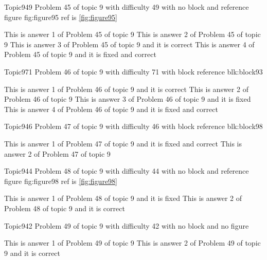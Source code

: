 \documentclass[master]{exam}
\begin{document}
\begin{problem}{Topic9}{49}
	Problem 45 of topic 9 with difficulty 49 with no block and reference figure fig:figure95 ref is \ref{fig:figure95}
	\begin{answers}
		\answer This is answer 1 of Problem 45 of topic 9 
		\answer This is answer 2 of Problem 45 of topic 9 
		\answer[correct] This is answer 3 of Problem 45 of topic 9 and it is correct
		 This is answer 4 of Problem 45 of topic 9 and it is fixed and correct
	\end{answers}
\end{problem}

\begin{problem}[requires=blk:block93]{Topic9}{71}
	Problem 46 of topic 9 with difficulty 71 with block reference blk:block93
	\begin{answers}
		\answer[correct] This is answer 1 of Problem 46 of topic 9 and it is correct
		\answer This is answer 2 of Problem 46 of topic 9 
		\answer[fixed] This is answer 3 of Problem 46 of topic 9 and it is fixed
		 This is answer 4 of Problem 46 of topic 9 and it is fixed and correct
	\end{answers}
\end{problem}

\begin{problem}[requires=blk:block98]{Topic9}{46}
	Problem 47 of topic 9 with difficulty 46 with block reference blk:block98
	\begin{answers}
		 This is answer 1 of Problem 47 of topic 9 and it is fixed and correct
		\answer This is answer 2 of Problem 47 of topic 9 
	\end{answers}
\end{problem}

\begin{problem}{Topic9}{44}
	Problem 48 of topic 9 with difficulty 44 with no block and reference figure fig:figure98 ref is \ref{fig:figure98}
	\begin{answers}
		\answer[fixed] This is answer 1 of Problem 48 of topic 9 and it is fixed
		\answer[correct] This is answer 2 of Problem 48 of topic 9 and it is correct
	\end{answers}
\end{problem}

\begin{problem}{Topic9}{42}
	Problem 49 of topic 9 with difficulty 42 with no block and no figure
	\begin{answers}
		\answer This is answer 1 of Problem 49 of topic 9 
		\answer[correct] This is answer 2 of Problem 49 of topic 9 and it is correct
	\end{answers}
\end{problem}
\end{document}
